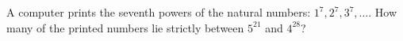 A computer prints the seventh powers of the natural numbers: $1^7,2^7,3^7,\dots$. How many of the printed numbers lie strictly between $5^{21}$ and $4^{28}$?
